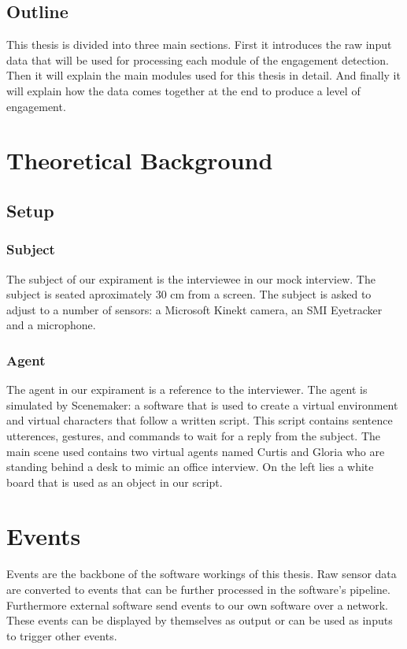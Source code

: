 \documentclass[12pt, a4paper, fleqn]{memoir}%
\begin{document}
\section{Outline}
\label{sec:Outline}
This thesis is divided into three main sections. First it introduces the raw input data that will be used for processing each module of the engagement detection. Then it will explain the main modules used for this thesis in detail. And finally it will explain how the data comes together at the end to produce a level of engagement.

\chapter{Theoretical Background}
\label{chap:TheoreticalBackground}

\section{Setup}
\label{sec:Section}

\subsection{Subject}
The subject of our expirament is the interviewee in our mock interview. The subject is seated aproximately 30 cm from a screen. The subject is asked to adjust to a number of sensors: a Microsoft Kinekt camera, an SMI Eyetracker and a microphone.

\subsection{Agent}
\label{subsec:Agent}
The agent in our expirament is a reference to the interviewer. The agent is simulated by Scenemaker: a software that is used to create a virtual environment and virtual characters that follow a written script. This script contains sentence utterences, gestures, and commands to wait for a reply from the subject. The main scene used contains two virtual agents named Curtis and Gloria who are standing behind a desk to mimic an office interview. On the left lies a white board that is used as an object in our script.

\chapter{Events}
\label{chap:Events}
Events are the backbone of the software workings of this thesis. Raw sensor data are converted to events that can be further processed in the software's pipeline. Furthermore external software send events to our own software over a network. These events can be displayed by themselves as output or can be used as inputs to trigger other events.
\end{document}
